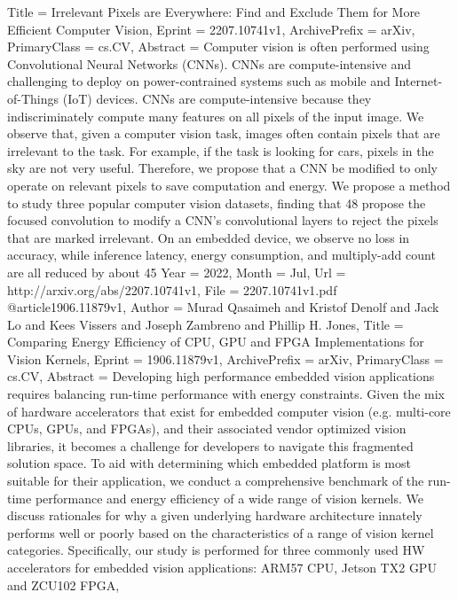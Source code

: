 {{{Title         = {Irrelevant Pixels are Everywhere: Find and Exclude Them for More
  Efficient Computer Vision},
Eprint        = {2207.10741v1},
ArchivePrefix = {arXiv},
PrimaryClass  = {cs.CV},
Abstract      = {Computer vision is often performed using Convolutional Neural Networks
(CNNs). CNNs are compute-intensive and challenging to deploy on
power-contrained systems such as mobile and Internet-of-Things (IoT) devices.
CNNs are compute-intensive because they indiscriminately compute many features
on all pixels of the input image. We observe that, given a computer vision
task, images often contain pixels that are irrelevant to the task. For example,
if the task is looking for cars, pixels in the sky are not very useful.
Therefore, we propose that a CNN be modified to only operate on relevant pixels
to save computation and energy. We propose a method to study three popular
computer vision datasets, finding that 48%
propose the focused convolution to modify a CNN's convolutional layers to
reject the pixels that are marked irrelevant. On an embedded device, we observe
no loss in accuracy, while inference latency, energy consumption, and
multiply-add count are all reduced by about 45%
Year          = {2022},
Month         = {Jul},
Url           = {http://arxiv.org/abs/2207.10741v1},
File          = {2207.10741v1.pdf}
}
@article{1906.11879v1,
Author        = {Murad Qasaimeh and Kristof Denolf and Jack Lo and Kees Vissers and Joseph Zambreno and Phillip H. Jones},
Title         = {Comparing Energy Efficiency of CPU, GPU and FPGA Implementations for
  Vision Kernels},
Eprint        = {1906.11879v1},
ArchivePrefix = {arXiv},
PrimaryClass  = {cs.CV},
Abstract      = {Developing high performance embedded vision applications requires balancing
run-time performance with energy constraints. Given the mix of hardware
accelerators that exist for embedded computer vision (e.g. multi-core CPUs,
GPUs, and FPGAs), and their associated vendor optimized vision libraries, it
becomes a challenge for developers to navigate this fragmented solution space.
To aid with determining which embedded platform is most suitable for their
application, we conduct a comprehensive benchmark of the run-time performance
and energy efficiency of a wide range of vision kernels. We discuss rationales
for why a given underlying hardware architecture innately performs well or
poorly based on the characteristics of a range of vision kernel categories.
Specifically, our study is performed for three commonly used HW accelerators
for embedded vision applications: ARM57 CPU, Jetson TX2 GPU and ZCU102 FPGA,
}}}}}
